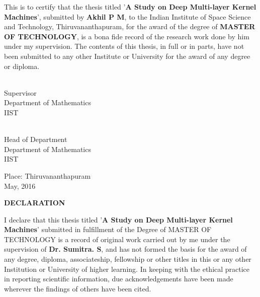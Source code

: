 \documentclass[a4paper, 12pt, oneside]{Thesis}  %
\begin{document}
\vspace*{0.5in}

\noindent This is to certify that the thesis titled '{\bf  A Study on Deep Multi-layer Kernel Machines}', submitted by {\bf Akhil P M}, to the Indian Institute of Space Science and Technology, Thiruvananthapuram, for the award of the degree of {\bf MASTER OF TECHNOLOGY}, is a bona fide
record of the research work done by him under my supervision. The contents of this thesis, in full or in parts, have not been submitted to any other Institute or University for the award of any degree or diploma.

\vspace*{1.5in}



\parbox{3in}{
 \\
\noindent             Supervisor \\ 
\noindent Department of Mathematics\\
\noindent IIST\\
} 
\hspace*{0.70in} 
\parbox{3.3in}{
 \\
\noindent             Head of Department\\ 
\noindent Department of Mathematics\\
\noindent IIST\\
}  

\vspace*{0.25in}

\noindent Place: Thiruvananthapuram\\
May, 2016
\clearpage
\clearpage
\vspace*{36pt}
\begin{center}
{\large \bf DECLARATION}
\end{center}


\vspace*{24pt}

\noindent I declare that this thesis titled '{\bf A Study on Deep Multi-layer Kernel Machines}' submitted in fulfillment of the Degree of MASTER OF TECHNOLOGY is a record of original work carried out by me under the supervision of {\bf Dr. Sumitra. S}, and has not formed the basis for the award of any degree, diploma, associateship, fellowship or other titles in this or any other Institution or University of higher learning. In keeping with the ethical practice in reporting scientific information, due acknowledgements have been made wherever the findings of others have been cited.\\
\end{document}
